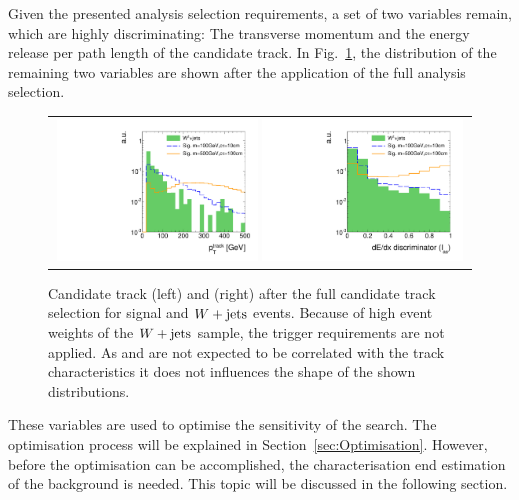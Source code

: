 Given the presented analysis selection requirements, a set of two variables remain, which are highly discriminating:
The transverse momentum and the energy release per path length of the candidate track.
In Fig.~\ref{fig:PtAndIasAfterFullPreselection}, the distribution of the remaining two variables are shown after the application of the full analysis selection.
\begin{figure}[!h]
  \centering 
  \begin{tabular}{c}
    \includegraphics[width=0.49\textwidth]{figures/analysis/AnalysisSelection/chiTracksfullSelectionNoTriggerCuts_Wjets/htrackPtSmallRange_log.pdf}
    \includegraphics[width=0.49\textwidth]{figures/analysis/AnalysisSelection/chiTracksfullSelectionNoTriggerCuts_Wjets/htrackASmiSmallRange_log.pdf}
  \end{tabular}
  \caption{Candidate track \pt (left) and \ias (right) after the full candidate track selection for signal and $W+\text{jets}$ events. 
           Because of high event weights of the $W+\text{jets}$ sample, the trigger requirements are not applied.
           As \met and \ptfirstjet are not expected to be correlated with the track characteristics it does not influences the shape of the shown distributions.}
  \label{fig:PtAndIasAfterFullPreselection}
\end{figure}
These variables are used to optimise the sensitivity of the search.
The optimisation process will be explained in Section~\ref{sec:Optimisation}.
However, before the optimisation can be accomplished, the characterisation end estimation of the background is needed.
This topic will be discussed in the following section.

